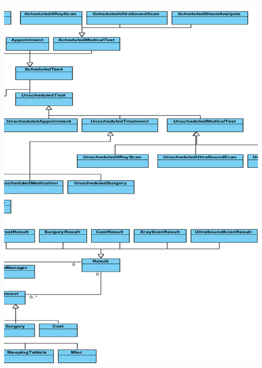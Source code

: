 \documentclass[11pt]{article}
\begin{document}
\includegraphics[width=170mm]{middle.png}\\
\end{document}
